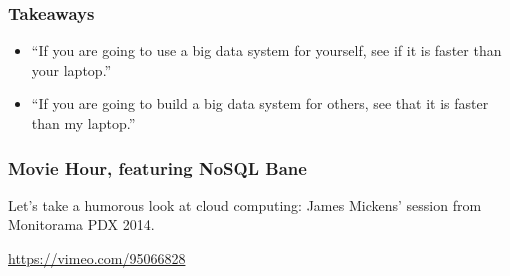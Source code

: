 \begin{frame}
\frametitle{Takeaways}

\Large
\begin{changemargin}{1cm}

\begin{itemize}
\item    ``If you are going to use a big data system for yourself, see if it is faster than your laptop.''\\[1em]
\item    ``If you are going to build a big data system for others, see that it is faster than my laptop.''
\end{itemize}

\end{changemargin}
\end{frame}




\begin{frame}
\frametitle{Movie Hour, featuring NoSQL Bane}

Let's take a humorous look at cloud computing: James Mickens' session from Monitorama PDX 2014. 

\begin{center}
\url{https://vimeo.com/95066828}
\end{center}


\end{frame}



